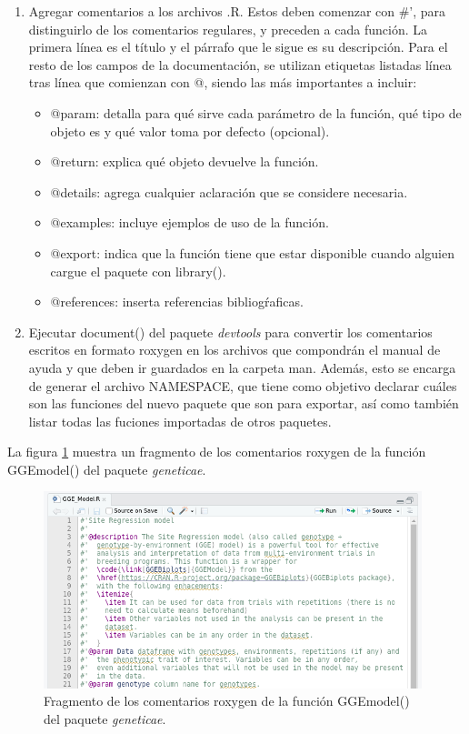 \begin{enumerate}

\item Agregar comentarios a los archivos .R. Estos deben comenzar con \#', para distinguirlo de los comentarios regulares, y preceden a cada función. La primera línea es el título y el párrafo que le sigue es su descripción. Para el resto de los campos de la documentación, se utilizan etiquetas listadas línea tras línea que comienzan con @, siendo las más importantes a incluir:

\begin{itemize}
\item @param: detalla para qué sirve cada parámetro de la función, qué tipo de objeto es y qué valor toma por defecto (opcional).
\item @return: explica qué objeto devuelve la función.
\item @details: agrega cualquier aclaración que se considere necesaria.
\item @examples: incluye ejemplos de uso de la función.
\item @export: indica que la función tiene que estar disponible cuando alguien cargue el paquete con \textcolor{fandango}{library()}.
\item @references: inserta referencias bibliogŕaficas.
\end{itemize}

\item Ejecutar \textcolor{fandango}{document()} del paquete \emph{devtools} para convertir los comentarios escritos en formato roxygen en los archivos que compondrán el manual de ayuda y que deben ir guardados en la carpeta man. Además, esto se encarga de generar el archivo NAMESPACE, que tiene como objetivo declarar cuáles son las funciones del nuevo paquete que son para exportar, así como también listar todas las fuciones importadas de otros paquetes.

\end{enumerate}

La figura \ref{fig:fig35} muestra un fragmento de los comentarios roxygen de la función \textcolor{fandango}{GGEmodel()} del paquete \emph{geneticae}.

\begin{figure}[h]
	\begin{center}
		\includegraphics[width=11cm]{./Graficos/COMENTARIOSROXYGEN.png}	
	\end{center}
	\caption{Fragmento de los comentarios roxygen de la función \textcolor{fandango}{GGEmodel()} del paquete \emph{geneticae}.}
	\label{fig:fig35}
\end{figure}


